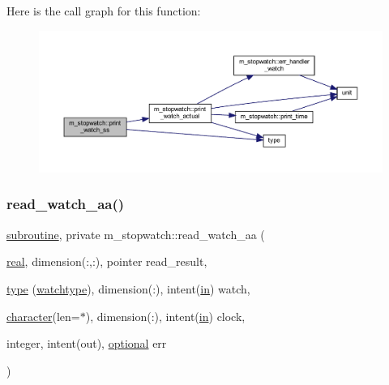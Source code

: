 Here is the call graph for this function\+:
\nopagebreak
\begin{figure}[H]
\begin{center}
\leavevmode
\includegraphics[width=350pt]{namespacem__stopwatch_aefcb05a2035a7204aefdd3e88c5621cc_cgraph}
\end{center}
\end{figure}
\mbox{\label{namespacem__stopwatch_a528d4073fce87b4e438a9cfbe0f12549}} 
\subsubsection{\texorpdfstring{read\+\_\+watch\+\_\+aa()}{read\_watch\_aa()}}
{\footnotesize\ttfamily \hyperlink{M__stopwatch_83_8txt_acfbcff50169d691ff02d4a123ed70482}{subroutine}, private m\+\_\+stopwatch\+::read\+\_\+watch\+\_\+aa (\begin{DoxyParamCaption}\item[{\hyperlink{read__watch_83_8txt_abdb62bde002f38ef75f810d3a905a823}{real}, dimension(\+:,\+:), pointer}]{read\+\_\+result,  }\item[{\hyperlink{stop__watch_83_8txt_a70f0ead91c32e25323c03265aa302c1c}{type} (\hyperlink{structm__stopwatch_1_1watchtype}{watchtype}), dimension(\+:), intent(\hyperlink{M__journal_83_8txt_afce72651d1eed785a2132bee863b2f38}{in})}]{watch,  }\item[{\hyperlink{option__stopwatch_83_8txt_abd4b21fbbd175834027b5224bfe97e66}{character}(len=$\ast$), dimension(\+:), intent(\hyperlink{M__journal_83_8txt_afce72651d1eed785a2132bee863b2f38}{in})}]{clock,  }\item[{integer, intent(out), \hyperlink{option__stopwatch_83_8txt_aa4ece75e7acf58a4843f70fe18c3ade5}{optional}}]{err }\end{DoxyParamCaption})\hspace{0.3cm}{\ttfamily [private]}}



